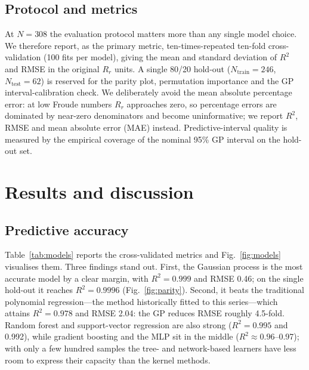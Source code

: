 \documentclass[pdflatex,sn-mathphys-num]{sn-jnl}%
\theoremstyle{thmstyleone}%
\theoremstyle{thmstyletwo}%
\theoremstyle{thmstylethree}%
\begin{document}
\subsection{Protocol and metrics}\label{subsec:protocol}
At $N=308$ the evaluation protocol matters more than any single model choice. We
therefore report, as the primary metric, ten-times-repeated ten-fold
cross-validation (100 fits per model), giving the mean and standard deviation of
$R^{2}$ and RMSE in the original $R_r$ units. A single 80/20 hold-out
($N_{\text{train}}=246$, $N_{\text{test}}=62$) is reserved for the parity plot,
permutation importance and the GP interval-calibration check. We deliberately
avoid the mean absolute percentage error: at low Froude numbers $R_r$ approaches
zero, so percentage errors are dominated by near-zero denominators and become
uninformative; we report $R^{2}$, RMSE and mean absolute error (MAE) instead.
Predictive-interval quality is measured by the empirical coverage of the nominal
95\% GP interval on the hold-out set.

\section{Results and discussion}\label{sec:results}

\subsection{Predictive accuracy}\label{subsec:acc}
Table~\ref{tab:models} reports the cross-validated metrics and
Fig.~\ref{fig:models} visualises them. Three findings stand out. First, the
Gaussian process is the most accurate model by a clear margin, with $R^{2}=0.999$
and RMSE 0.46; on the single hold-out it reaches $R^{2}=0.9996$
(Fig.~\ref{fig:parity}). Second, it beats the traditional polynomial
regression---the method historically fitted to this series---which attains
$R^{2}=0.978$ and RMSE 2.04: the GP reduces RMSE roughly 4.5-fold. Random forest
and support-vector regression are also strong ($R^{2}=0.995$ and 0.992), while
gradient boosting and the MLP sit in the middle ($R^{2}\approx0.96$--0.97); with
only a few hundred samples the tree- and network-based learners have less room to
express their capacity than the kernel methods.
\end{document}
